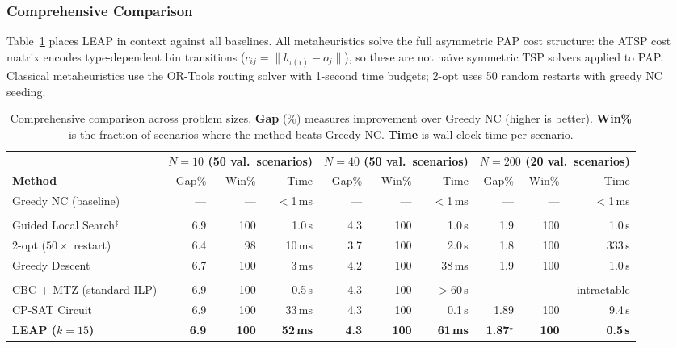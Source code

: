 \documentclass[conference]{IEEEtran}
\begin{document}
\subsubsection{Comprehensive Comparison}\label{sec:baselines}

Table~\ref{tab:baselines} places LEAP in context against all baselines. All metaheuristics solve the full asymmetric PAP cost structure: the ATSP cost matrix encodes type-dependent bin transitions ($c_{ij} = \lVert b_{\tau(i)} - o_j \rVert$), so these are not na\"ive symmetric TSP solvers applied to PAP. Classical metaheuristics use the OR-Tools routing solver \cite{ortools} with 1-second time budgets; 2-opt uses 50 random restarts with greedy NC seeding.

\begin{table}[t]
\caption{Comprehensive comparison across problem sizes. \textbf{Gap} (\%) measures improvement over Greedy NC (higher is better). \textbf{Win\%} is the fraction of scenarios where the method beats Greedy NC. \textbf{Time} is wall-clock time per scenario.}
\label{tab:baselines}
\centering
\begin{tabular}{@{}l rrr rrr rrr@{}}
\toprule
& \multicolumn{3}{c}{\textbf{$N{=}10$ (50 val.\ scenarios)}} & \multicolumn{3}{c}{\textbf{$N{=}40$ (50 val.\ scenarios)}} & \multicolumn{3}{c}{\textbf{$N{=}200$ (20 val.\ scenarios)}} \\
\cmidrule(lr){2-4} \cmidrule(lr){5-7} \cmidrule(lr){8-10}
\textbf{Method} & Gap\% & Win\% & Time & Gap\% & Win\% & Time & Gap\% & Win\% & Time \\
\midrule
Greedy NC (baseline) & --- & --- & $<$1\,ms & --- & --- & $<$1\,ms & --- & --- & $<$1\,ms \\
\addlinespace[3pt]
\multicolumn{10}{@{}l}{\textit{Classical metaheuristics (OR-Tools, 1\,s budget)}} \\
Guided Local Search$^\ddagger$ & 6.9 & 100 & 1.0\,s & 4.3 & 100 & 1.0\,s & 1.9 & 100 & 1.0\,s \\
2-opt ($50{\times}$ restart) & 6.4 & 98 & 10\,ms & 3.7 & 100 & 2.0\,s & 1.8 & 100 & 333\,s \\
Greedy Descent & 6.7 & 100 & 3\,ms & 4.2 & 100 & 38\,ms & 1.9 & 100 & 1.0\,s \\
\addlinespace[3pt]
\multicolumn{10}{@{}l}{\textit{Exact solvers (ours)}} \\
CBC + MTZ (standard ILP) & 6.9 & 100 & 0.5\,s & 4.3 & 100 & $>$60\,s & --- & --- & intractable \\
CP-SAT Circuit & 6.9 & 100 & 33\,ms & 4.3 & 100 & 0.1\,s & 1.89 & 100 & 9.4\,s \\
\textbf{LEAP ($k{=}15$)} & \textbf{6.9} & \textbf{100} & \textbf{52\,ms} & \textbf{4.3} & \textbf{100} & \textbf{61\,ms} & \textbf{1.87}$^\star$ & \textbf{100} & \textbf{0.5\,s} \\
\bottomrule
\end{tabular}


\end{table}
\end{document}
